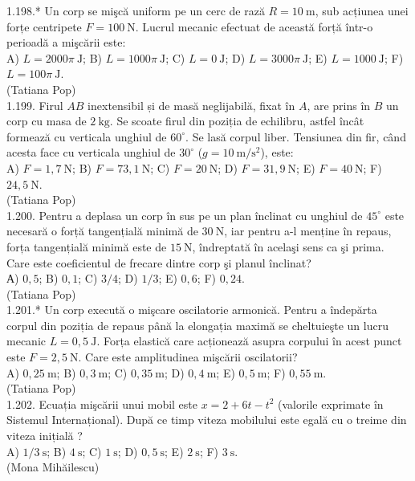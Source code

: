 1.198.* Un corp se mişcă uniform pe un cerc de rază $R=10 \mathrm{~m}$, sub acțiunea unei forțe centripete $F=100 \mathrm{~N}$. Lucrul mecanic efectuat de această forță într-o perioadă a mişcării este:\\ A) $L=2000 \pi \mathrm{~J}$; B) $L=1000 \pi \mathrm{~J}$; C) $L=0 \mathrm{~J}$; D) $L=3000 \pi \mathrm{~J}$; E) $L=1000 \mathrm{~J}$; F) $L=100 \pi \mathrm{~J}$.\\ (Tatiana Pop)\\

1.199. Firul $AB$ inextensibil și de masă neglijabilă, fixat în $A$, are prins în $B$ un corp cu masa de $2 \mathrm{~kg}$. Se scoate firul din poziția de echilibru, astfel încât formează cu verticala unghiul de $60^{\circ}$. Se lasă corpul liber. Tensiunea din fir, când acesta face cu verticala unghiul de $30^{\circ}$ ($g=10 \mathrm{~m} / \mathrm{s}^{2}$), este:\\ A) $F=1,7 \mathrm{~N}$; B) $F=73,1 \mathrm{~N}$; C) $F=20 \mathrm{~N}$; D) $F=31,9 \mathrm{~N}$; E) $F=40 \mathrm{~N}$; F) $24,5 \mathrm{~N}$.\\ (Tatiana Pop)\\

1.200. Pentru a deplasa un corp în sus pe un plan înclinat cu unghiul de $45^{\circ}$ este necesară o forță tangențială minimă de $30 \mathrm{~N}$, iar pentru a-l menține în repaus, forța tangențială minimă este de $15 \mathrm{~N}$, îndreptată în acelaşi sens ca şi prima. Care este coeficientul de frecare dintre corp şi planul înclinat?\\ А) $0,5$; B) $0,1$; C) $3 / 4$; D) $1 / 3$; E) $0,6$; F) $0,24$.\\ (Tatiana Pop)\\

1.201.* Un corp execută o mişcare oscilatorie armonică. Pentru a îndepărta corpul din poziția de repaus până la elongația maximă se cheltuieşte un lucru mecanic $L=0,5 \mathrm{~J}$. Forța elastică care acționează asupra corpului în acest punct este $F=2,5 \mathrm{~N}$. Care este amplitudinea mişcării oscilatorii?\\ A) $0,25 \mathrm{~m}$; B) $0,3 \mathrm{~m}$; C) $0,35 \mathrm{~m}$; D) $0,4 \mathrm{~m}$; E) $0,5 \mathrm{~m}$; F) $0,55 \mathrm{~m}$.\\ (Tatiana Pop)\\

1.202. Ecuația mişcării unui mobil este $x=2+6 t-t^{2}$ (valorile exprimate în Sistemul Internațional). După ce timp viteza mobilului este egală cu o treime din viteza inițială ?\\ A) $1 / 3 \mathrm{~s}$; B) $4 \mathrm{~s}$; C) $1 \mathrm{~s}$; D) $0,5 \mathrm{~s}$; E) $2 \mathrm{~s}$; F) $3 \mathrm{~s}$.\\ (Mona Mihăilescu)\\

